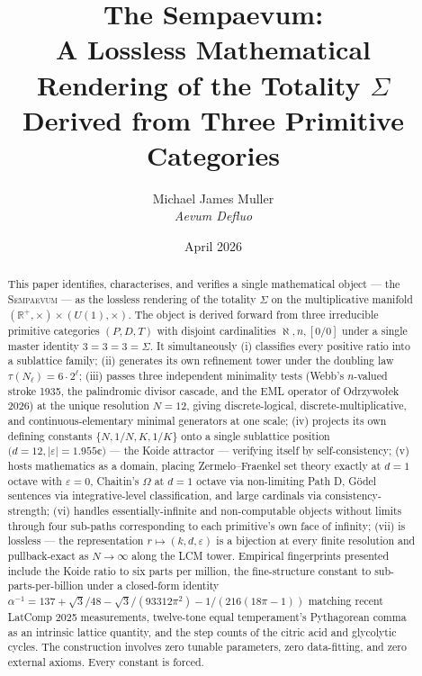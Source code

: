 \documentclass[11pt,a4paper]{article}
\title{\bfseries The Sempaevum:\\[2pt]
A Lossless Mathematical Rendering of the Totality $\Sigma$\\[2pt]
Derived from Three Primitive Categories}
\author{Michael James Muller\\
\small\textit{Aevum Defluo}}
\date{April 2026}
\theoremstyle{definition}
\theoremstyle{remark}
\newcommand{\R}{\mathbb{R}}
\newcommand{\Sempaevum}{\textsc{Sempaevum}}
\begin{document}
\maketitle

\begin{abstract}
\noindent
This paper identifies, characterises, and verifies a single mathematical object — the \Sempaevum{} — as the lossless rendering of the totality $\Sigma$ on the multiplicative manifold $(\R^{+},\times) \times (U(1),\times)$. The object is derived forward from three irreducible primitive categories $(P,D,T)$ with disjoint cardinalities $\aleph, n, [0/0]$ under a single master identity $3=3=3=\Sigma$. It simultaneously (i) classifies every positive ratio into a sublattice family; (ii) generates its own refinement tower under the doubling law $\tau(N_{\ell}) = 6 \cdot 2^{\ell}$; (iii) passes three independent minimality tests (Webb's $n$-valued stroke 1935, the palindromic divisor cascade, and the EML operator of Odrzywołek 2026) at the unique resolution $N=12$, giving discrete-logical, discrete-multiplicative, and continuous-elementary minimal generators at one scale; (iv) projects its own defining constants $\{N, 1/N, K, 1/K\}$ onto a single sublattice position $(d=12, |\varepsilon|=1.955$¢$)$ — the Koide attractor — verifying itself by self-consistency; (v) hosts mathematics as a domain, placing Zermelo--Fraenkel set theory exactly at $d=1$ octave with $\varepsilon=0$, Chaitin's $\Omega$ at $d=1$ octave via non-limiting Path D, Gödel sentences via integrative-level classification, and large cardinals via consistency-strength; (vi) handles essentially-infinite and non-computable objects without limits through four sub-paths corresponding to each primitive's own face of infinity; (vii) is lossless — the representation $r \mapsto (k,d,\varepsilon)$ is a bijection at every finite resolution and pullback-exact as $N \to \infty$ along the LCM tower. Empirical fingerprints presented include the Koide ratio to six parts per million, the fine-structure constant to sub-parts-per-billion under a closed-form identity $\alpha^{-1} = 137 + \sqrt{3}/48 - \sqrt{3}/(93312\pi^{2}) - 1/(216(18\pi-1))$ matching recent LatComp 2025 measurements, twelve-tone equal temperament's Pythagorean comma as an intrinsic lattice quantity, and the step counts of the citric acid and glycolytic cycles. The construction involves zero tunable parameters, zero data-fitting, and zero external axioms. Every constant is forced.
\end{abstract}
\end{document}
